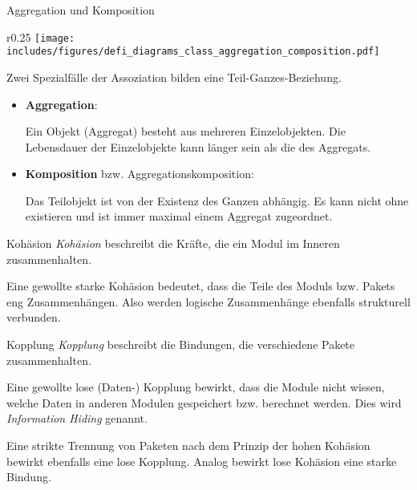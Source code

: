 \begin{diag}{Aggregation und Komposition}
    \begin{wrapfigure}{r}{0.25\textwidth}
        \centering
        \texttt{[image: includes/figures/defi\_diagrams\_class\_aggregation\_composition.pdf]}
    \end{wrapfigure}
    Zwei Spezialfälle der Assoziation bilden eine Teil-Ganzes-Beziehung.

    \begin{itemize}
        \item \textbf{Aggregation}:

              Ein Objekt (Aggregat) besteht aus mehreren Einzelobjekten.
              Die Lebensdauer der Einzelobjekte kann länger sein als die des Aggregats.
        \item \textbf{Komposition} bzw. Aggregationskomposition:

              Das Teilobjekt ist von der Existenz des Ganzen abhängig.
              Es kann nicht ohne existieren und ist immer maximal einem Aggregat zugeordnet.
    \end{itemize}
\end{diag}

\newpage

\begin{defi}{Kohäsion}
    \emph{Kohäsion} beschreibt die Kräfte, die ein Modul im Inneren zusammenhalten.

    Eine gewollte starke Kohäsion bedeutet, dass die Teile des Moduls bzw. Pakets eng Zusammenhängen.
    Also werden logische Zusammenhänge ebenfalls strukturell verbunden.
\end{defi}

\begin{defi}{Kopplung}
    \emph{Kopplung} beschreibt die Bindungen, die verschiedene Pakete zusammenhalten.

    Eine gewollte lose (Daten-) Kopplung bewirkt, dass die Module nicht wissen, welche Daten in anderen Modulen gespeichert bzw. berechnet werden.
    Dies wird \emph{Information Hiding} genannt.

    Eine strikte Trennung von Paketen nach dem Prinzip der hohen Kohäsion bewirkt ebenfalls eine lose Kopplung.
    Analog bewirkt lose Kohäsion eine starke Bindung.
\end{defi}

